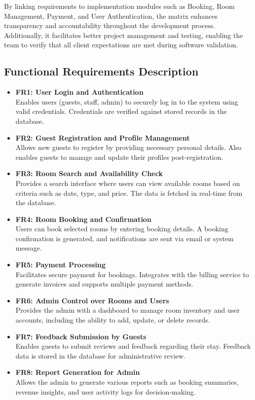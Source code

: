\documentclass[a4paper,12pt]{article}
\begin{document}
By linking requirements to implementation modules such as Booking, Room Management, Payment, and User Authentication, the matrix enhances transparency and accountability throughout the development process. Additionally, it facilitates better project management and testing, enabling the team to verify that all client expectations are met during software validation.

\subsection*{Functional Requirements Description}

\begin{itemize}
    \item \textbf{FR1: User Login and Authentication} \\
    Enables users (guests, staff, admin) to securely log in to the system using valid credentials. Credentials are verified against stored records in the database.

    \item \textbf{FR2: Guest Registration and Profile Management} \\
    Allows new guests to register by providing necessary personal details. Also enables guests to manage and update their profiles post-registration.

    \item \textbf{FR3: Room Search and Availability Check} \\
    Provides a search interface where users can view available rooms based on criteria such as date, type, and price. The data is fetched in real-time from the database.

    \item \textbf{FR4: Room Booking and Confirmation} \\
    Users can book selected rooms by entering booking details. A booking confirmation is generated, and notifications are sent via email or system message.

    \item \textbf{FR5: Payment Processing} \\
    Facilitates secure payment for bookings. Integrates with the billing service to generate invoices and supports multiple payment methods.

    \item \textbf{FR6: Admin Control over Rooms and Users} \\
    Provides the admin with a dashboard to manage room inventory and user accounts, including the ability to add, update, or delete records.

    \item \textbf{FR7: Feedback Submission by Guests} \\
    Enables guests to submit reviews and feedback regarding their stay. Feedback data is stored in the database for administrative review.

    \item \textbf{FR8: Report Generation for Admin} \\
    Allows the admin to generate various reports such as booking summaries, revenue insights, and user activity logs for decision-making.
\end{itemize}
\end{document}
